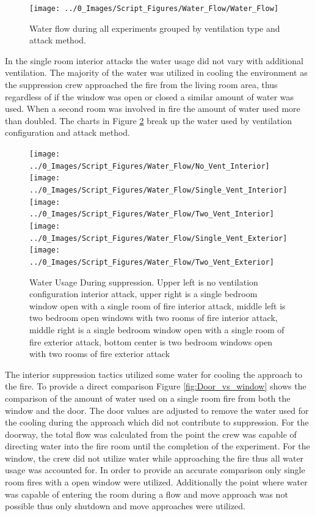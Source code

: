 \documentclass[12pt,oneside]{book}
\begin{document}
\begin{figure}[H]
\centering
\texttt{[image: ../0\_Images/Script\_Figures/Water\_Flow/Water\_Flow]}
\caption[Water Flow All Experiments]{Water flow during all experiments grouped by ventilation type and attack method.}
\label{fig:water_flow_all}
\end{figure}

In the single room interior attacks the water usage did not vary with additional ventilation. The majority of the water was utilized in cooling the environment as the suppression crew approached the fire from the living room area, thus regardless of if the window was open or closed a similar amount of water was used. When a second room was involved in fire the amount of water used more than doubled. The charts in Figure \ref{fig:water_flow_vent_compare} break up the water used by ventilation configuration and attack method.  

\begin{figure}[H]
\centering
\texttt{[image: ../0\_Images/Script\_Figures/Water\_Flow/No\_Vent\_Interior]}
\texttt{[image: ../0\_Images/Script\_Figures/Water\_Flow/Single\_Vent\_Interior]}
\texttt{[image: ../0\_Images/Script\_Figures/Water\_Flow/Two\_Vent\_Interior]}
\texttt{[image: ../0\_Images/Script\_Figures/Water\_Flow/Single\_Vent\_Exterior]}
\texttt{[image: ../0\_Images/Script\_Figures/Water\_Flow/Two\_Vent\_Exterior]}
\caption[Water Usage vs. Ventilation]{Water Usage During suppression. Upper left is no ventilation configuration interior attack, upper right is a single bedroom window open with a single room of fire interior attack, middle left is two bedroom open windows with two rooms of fire interior attack, middle right is a single bedroom window open with a single room of fire exterior attack, bottom center is two bedroom windows open with two rooms of fire exterior attack}
\label{fig:water_flow_vent_compare}
\end{figure}

The interior suppression tactics utilized some water for cooling the approach to the fire. To provide a direct comparison Figure \ref{fig:Door_vs_window} shows the comparison of the amount of water used on a single room fire from both the window and the door. The door values are adjusted to remove the water used for the cooling during the approach which did not contribute to suppression. For the doorway, the total flow was calculated from the point the crew was capable of directing water into the fire room until the completion of the experiment. For the window, the crew did not utilize water while approaching the fire thus all water usage was accounted for. In order to provide an accurate comparison only single room fires with a open window were utilized. Additionally the point where water was capable of entering the room during a flow and move approach was not possible thus only shutdown and move approaches were utilized.
\end{document}
